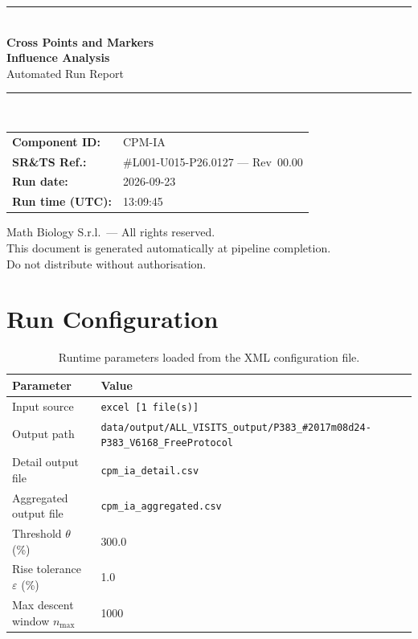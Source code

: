 \documentclass[a4paper,11pt]{article}
\begin{document}
\begin{titlepage}
\begin{center}
  \vspace*{1.8cm}
  {\color{dmaaccent}\rule{\linewidth}{1.5pt}}\\[0.6cm]
  {\LARGE\bfseries\color{dmaaccent}
    Cross Points and Markers\\[0.25cm]
    Influence Analysis}\\[0.4cm]
  {\Large Automated Run Report}\\[0.3cm]
  {\color{dmaaccent}\rule{\linewidth}{1.5pt}}\\[2cm]

  \begin{tabular}{ll}
    \textbf{Component ID:}   & CPM-IA \\[0.3cm]
    \textbf{SR\&TS Ref.:}    & \#L001-U015-P26.0127 --- Rev~00.00 \\[0.3cm]
    \textbf{Run date:}       & 2026-09-23 \\[0.3cm]
    \textbf{Run time (UTC):} & 13:09:45 \\
  \end{tabular}

  \vfill
  {\color{dmagray}\small
    Math Biology S.r.l.\ --- All rights reserved.\\
    This document is generated automatically at pipeline completion.\\
    Do not distribute without authorisation.}
\end{center}
\end{titlepage}

\tableofcontents
\clearpage

\section{Run Configuration}

\begin{table}[h!]
\centering
\small
\caption{Runtime parameters loaded from the XML configuration file.}
\begin{tabular}{ll}
\toprule
\textbf{Parameter} & \textbf{Value} \\
\midrule
Input source                      & \texttt{excel [1 file(s)]} \\
Output path                       & \texttt{data/output/ALL\_VISITS\_output/P383\_\#2017m08d24-P383\_V6168\_FreeProtocol} \\
Detail output file                & \texttt{cpm\_ia\_detail.csv} \\
Aggregated output file            & \texttt{cpm\_ia\_aggregated.csv} \\
Threshold $\theta$ (\%)           & 300.0 \\
Rise tolerance $\varepsilon$ (\%) & 1.0 \\
Max descent window $n_{\max}$     & 1000 \\
\bottomrule
\end{tabular}
\end{table}
\end{document}
